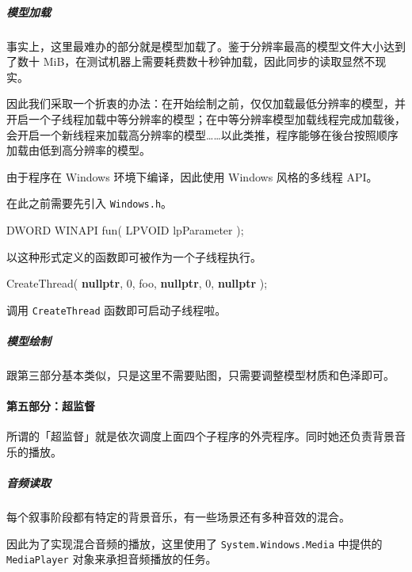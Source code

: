 \documentclass[
]{article}
\newenvironment{Shaded}{}{}
\newcommand{\DecValTok}[1]{\textcolor[rgb]{0.25,0.63,0.44}{#1}}
\newcommand{\KeywordTok}[1]{\textcolor[rgb]{0.00,0.44,0.13}{\textbf{#1}}}
\newcommand{\NormalTok}[1]{#1}
\begin{document}
\hypertarget{header-n246}{%
\subparagraph{模型加载}\label{header-n246}}

事实上，这里最难办的部分就是模型加载了。鉴于分辨率最高的模型文件大小达到了数十
MiB，在测试机器上需要耗费数十秒钟加载，因此同步的读取显然不现实。

因此我们采取一个折衷的办法：在开始绘制之前，仅仅加载最低分辨率的模型，并开启一个子线程加载中等分辨率的模型；在中等分辨率模型加载线程完成加载後，会开启一个新线程来加载高分辨率的模型\ldots\ldots 以此类推，程序能够在後台按照顺序加载由低到高分辨率的模型。

由于程序在 Windows 环境下编译，因此使用 Windows 风格的多线程 API。

在此之前需要先引入 \texttt{Windows.h}。

\begin{Shaded}
\begin{Highlighting}[]
\NormalTok{DWORD WINAPI fun( LPVOID lpParameter );}
\end{Highlighting}
\end{Shaded}

以这种形式定义的函数即可被作为一个子线程执行。

\begin{Shaded}
\begin{Highlighting}[]
\NormalTok{CreateThread( }\KeywordTok{nullptr}\NormalTok{, }\DecValTok{0}\NormalTok{, foo, }\KeywordTok{nullptr}\NormalTok{, }\DecValTok{0}\NormalTok{, }\KeywordTok{nullptr}\NormalTok{ );}
\end{Highlighting}
\end{Shaded}

调用 \texttt{CreateThread} 函数即可启动子线程啦。

\hypertarget{header-n255}{%
\subparagraph{模型绘制}\label{header-n255}}

跟第三部分基本类似，只是这里不需要贴图，只需要调整模型材质和色泽即可。

\hypertarget{header-n257}{%
\paragraph{第五部分：超监督}\label{header-n257}}

所谓的「超监督」就是依次调度上面四个子程序的外壳程序。同时她还负责背景音乐的播放。

\hypertarget{header-n259}{%
\subparagraph{音频读取}\label{header-n259}}

每个叙事阶段都有特定的背景音乐，有一些场景还有多种音效的混合。

因此为了实现混合音频的播放，这里使用了 \texttt{System.Windows.Media}
中提供的 \texttt{MediaPlayer} 对象来承担音频播放的任务。
\end{document}
